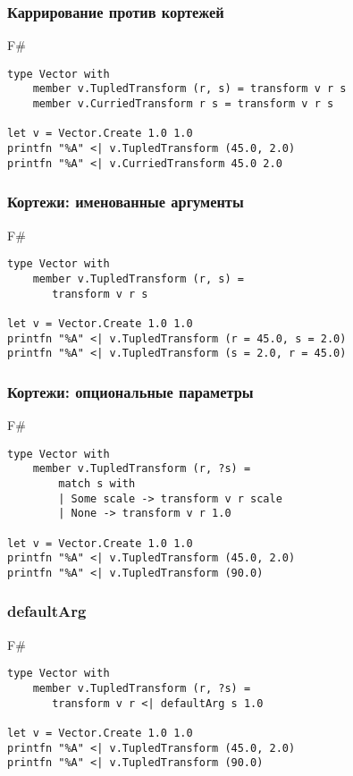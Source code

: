 \documentclass[xetex,mathserif,serif]{beamer}
\begin{document}
	\begin{frame}[fragile]
		\frametitle{Каррирование против кортежей}
		\begin{exampleblock}{F\#}
			\begin{lstlisting}
type Vector with
    member v.TupledTransform (r, s) = transform v r s
    member v.CurriedTransform r s = transform v r s

let v = Vector.Create 1.0 1.0
printfn "%A" <| v.TupledTransform (45.0, 2.0)
printfn "%A" <| v.CurriedTransform 45.0 2.0
\end{lstlisting}
\end{exampleblock}
\end{frame}

	\begin{frame}[fragile]
		\frametitle{Кортежи: именованные аргументы}
		\begin{exampleblock}{F\#}
			\begin{lstlisting}
type Vector with
    member v.TupledTransform (r, s) = 
       transform v r s

let v = Vector.Create 1.0 1.0
printfn "%A" <| v.TupledTransform (r = 45.0, s = 2.0)
printfn "%A" <| v.TupledTransform (s = 2.0, r = 45.0)
\end{lstlisting}
\end{exampleblock}
\end{frame}

	\begin{frame}[fragile]
		\frametitle{Кортежи: опциональные параметры}
		\begin{exampleblock}{F\#}
			\begin{lstlisting}
type Vector with
    member v.TupledTransform (r, ?s) = 
        match s with
        | Some scale -> transform v r scale
        | None -> transform v r 1.0

let v = Vector.Create 1.0 1.0
printfn "%A" <| v.TupledTransform (45.0, 2.0)
printfn "%A" <| v.TupledTransform (90.0)
\end{lstlisting}
\end{exampleblock}
\end{frame}

	\begin{frame}[fragile]
		\frametitle{defaultArg}
		\begin{exampleblock}{F\#}
			\begin{lstlisting}
type Vector with
    member v.TupledTransform (r, ?s) = 
       transform v r <| defaultArg s 1.0

let v = Vector.Create 1.0 1.0
printfn "%A" <| v.TupledTransform (45.0, 2.0)
printfn "%A" <| v.TupledTransform (90.0)
\end{lstlisting}
\end{exampleblock}
\end{frame}
\end{document}
